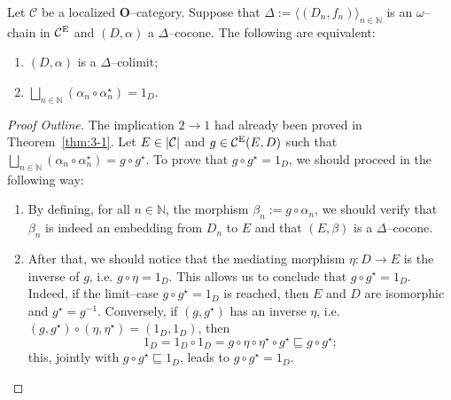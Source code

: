 \begin{thm}\label{thm:3-2}
  Let \(\mathcal{C}\) be a localized \(\mathbf{O}\)--category.
  Suppose that \(\Delta := {\langle(D_n,f_n)\rangle}_{n \in \mathbb{N}}\) is an \(\omega\)--chain in \(\mathcal{C}^\textup{E}\) and \((D,\alpha)\) a \(\Delta\)--cocone. %
  The following are equivalent:
  \begin{enumerate}
    \item \((D,\alpha)\) is a \(\Delta{}\)--colimit;
    \item \(\bigsqcup_{n \in \mathbb{N}}(\alpha_n \circ \alpha_n^\star) = 1_D\).
  \end{enumerate}
\end{thm}
\begin{proof}[Proof Outline]
  The implication \(2 \to 1\) had already been proved in Theorem~\ref{thm:3-1}.
  Let \(E \in \lvert \mathcal{C} \rvert\) and \(g \in \mathcal{C}^\textup{E}(E,D)\) such that \(\bigsqcup_{n \in \mathbb{N}}(\alpha_n \circ \alpha_n^\star) = g \circ g^\star\). %
  To prove that \(g \circ g^\star = 1_D\), we should proceed in the following way:
  \begin{enumerate}
    \item By defining, for all \(n \in \mathbb{N}\), the morphism \(\beta_n := g \circ \alpha_n\), we should verify that \(\beta_n\) is indeed an embedding from \(D_n\) to \(E\) and that \((E,\beta)\) is a \(\Delta\)--cocone. %
    \item After that, we should notice that the mediating morphism \(\eta \colon D \to E\) is the inverse of \(g\), i.e. \(g \circ \eta = 1_D\).
    This allows us to conclude that \(g \circ g^\star = 1_D\).
    Indeed, if the limit--case \(g \circ g^\star = 1_D\) is reached, then \(E\) and \(D\) are isomorphic and \(g^\star = g^{-1}\). %
    Conversely, if \((g,g^\star)\) has an inverse \(\eta\), i.e. \((g,g^\star) \circ (\eta,\eta^\star) = (1_D,1_D)\), then %
    \begin{equation*}
        1_D = 1_D \circ 1_D = g \circ \eta \circ \eta^\star \circ g^\star
        \sqsubseteq g \circ g^\star;
    \end{equation*}
    this, jointly with \(g \circ g^\star \sqsubseteq 1_D\), leads to \(g \circ g^\star = 1_D\). \qedhere
  \end{enumerate}
\end{proof}

